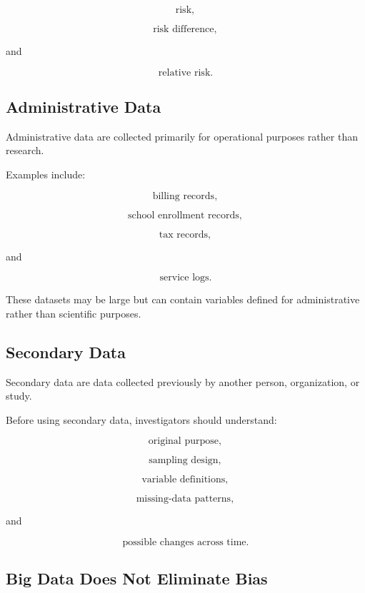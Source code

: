 \[
\boxed{
\text{risk},
}
\]

\[
\boxed{
\text{risk difference},
}
\]

and

\[
\boxed{
\text{relative risk}.
}
\]

\subsection{Administrative Data}
\label{subsec:administrative-data}

Administrative data are collected primarily for operational purposes
rather than research.

Examples include:

\[
\text{billing records},
\]

\[
\text{school enrollment records},
\]

\[
\text{tax records},
\]

and

\[
\text{service logs}.
\]

These datasets may be large but can contain variables defined for
administrative rather than scientific purposes.

\subsection{Secondary Data}
\label{subsec:secondary-data}

Secondary data are data collected previously by another person,
organization, or study.

Before using secondary data, investigators should understand:

\[
\text{original purpose},
\]

\[
\text{sampling design},
\]

\[
\text{variable definitions},
\]

\[
\text{missing-data patterns},
\]

and

\[
\text{possible changes across time}.
\]

\subsection{Big Data Does Not Eliminate Bias}
\label{subsec:big-data-bias}

